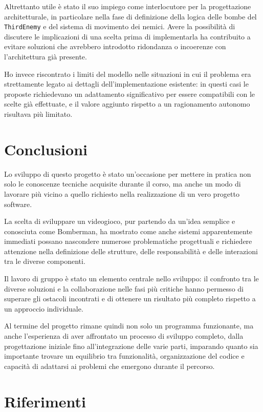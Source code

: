 \documentclass[a4paper,11pt]{article}
\begin{document}
Altrettanto utile è stato il suo impiego come interlocutore per la progettazione
architetturale, in particolare nella fase di definizione della logica delle bombe
del \texttt{ThirdEnemy} e del sistema di movimento dei nemici. Avere la possibilità
di discutere le implicazioni di una scelta prima di implementarla ha contribuito a
evitare soluzioni che avrebbero introdotto ridondanza o incoerenze con l'architettura
già presente.
 
Ho invece riscontrato i limiti del modello nelle situazioni in cui il problema era
strettamente legato ai dettagli dell'implementazione esistente: in questi casi le
proposte richiedevano un adattamento significativo per essere compatibili con le
scelte già effettuate, e il valore aggiunto rispetto a un ragionamento autonomo
risultava più limitato.



\section{Conclusioni}

Lo sviluppo di questo progetto è stato un'occasione per mettere in pratica non solo le conoscenze tecniche 
acquisite durante il corso, ma anche un modo di lavorare più vicino a quello richiesto nella realizzazione 
di un vero progetto software.

La scelta di sviluppare un videogioco, pur partendo da un'idea semplice e conosciuta come Bomberman, 
ha mostrato come anche sistemi apparentemente immediati possano nascondere numerose problematiche progettuali 
e richiedere attenzione nella definizione delle strutture, delle responsabilità e delle interazioni tra le diverse componenti.

Il lavoro di gruppo è stato un elemento centrale nello sviluppo: il confronto tra le diverse soluzioni e 
la collaborazione nelle fasi più critiche hanno permesso di superare gli ostacoli incontrati e di ottenere 
un risultato più completo rispetto a un approccio individuale.

Al termine del progetto rimane quindi non solo un programma funzionante, ma anche l'esperienza di aver affrontato 
un processo di sviluppo completo, dalla progettazione iniziale fino all'integrazione delle varie parti, 
imparando quanto sia importante trovare un equilibrio tra funzionalità, organizzazione del codice e capacità 
di adattarsi ai problemi che emergono durante il percorso.


\section{Riferimenti}
\end{document}
